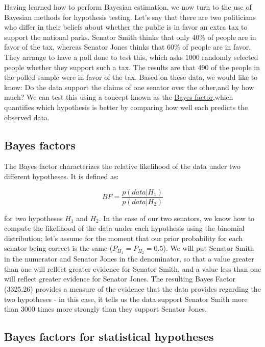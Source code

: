\documentclass[12pt,]{book}
\theoremstyle{definition}
\theoremstyle{definition}
\theoremstyle{definition}
\theoremstyle{remark}
\begin{document}
Having learned how to perform Bayesian estimation, we now turn to the use of Bayesian methods for hypothesis testing. Let's say that there are two politicians who differ in their beliefs about whether the public is in favor an extra tax to support the national parks. Senator Smith thinks that only 40\% of people are in favor of the tax, whereas Senator Jones thinks that 60\% of people are in favor. They arrange to have a poll done to test this, which asks 1000 randomly selected people whether they support such a tax. The results are that 490 of the people in the polled sample were in favor of the tax. Based on these data, we would like to know: Do the data support the claims of one senator over the other,and by how much? We can test this using a concept known as the \href{https://bayesfactor.blogspot.com/2014/02/the-bayesfactor-package-this-blog-is.html}{Bayes factor},which quantifies which hypothesis is better by comparing how well each predicts the observed data.

\hypertarget{Bayes-factors}{%
\subsection{Bayes factors}\label{Bayes-factors}}

The Bayes factor characterizes the relative likelihood of the data under two different hypotheses. It is defined as:

\[
BF = \frac{p(data|H_1)}{p(data|H_2)}
\]

for two hypotheses \(H_1\) and \(H_2\). In the case of our two senators, we know how to compute the likelihood of the data under each hypothesis using the binomial distribution; let's assume for the moment that our prior probability for each senator being correct is the same (\(P_{H_1} = P_{H_2} = 0.5\)). We will put Senator Smith in the numerator and Senator Jones in the denominator, so that a value greater than one will reflect greater evidence for Senator Smith, and a value less than one will reflect greater evidence for Senator Jones. The resulting Bayes Factor (3325.26) provides a measure of the evidence that the data provides regarding the two hypotheses - in this case, it tells us the data support Senator Smith more than 3000 times more strongly than they support Senator Jones.

\hypertarget{bayes-factors-for-statistical-hypotheses}{%
\subsection{Bayes factors for statistical hypotheses}\label{bayes-factors-for-statistical-hypotheses}}
\end{document}
